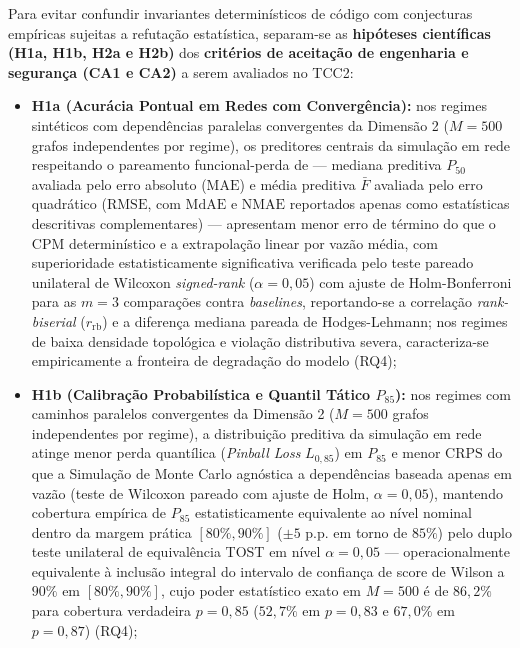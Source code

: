 \documentclass[12pt,openany,oneside,a4paper,english,brazilian,sumario=tradicional]{abntex2}
\begin{document}
Para evitar confundir invariantes determinísticos de código com conjecturas empíricas sujeitas a refutação estatística, separam-se as \textbf{hipóteses científicas (H1a, H1b, H2a e H2b)} dos \textbf{critérios de aceitação de engenharia e segurança (CA1 e CA2)} a serem avaliados no TCC2:

\begin{itemize}
  \item \textbf{H1a (Acurácia Pontual em Redes com Convergência):} nos regimes sintéticos com dependências paralelas convergentes da Dimensão 2 ($M=500$ grafos independentes por regime), os preditores centrais da simulação em rede respeitando o pareamento funcional-perda de  — mediana preditiva $P_{50}$ avaliada pelo erro absoluto ($\mathrm{MAE}$) e média preditiva $\bar{F}$ avaliada pelo erro quadrático ($\mathrm{RMSE}$, com $\mathrm{MdAE}$ e $\mathrm{NMAE}$ reportados apenas como estatísticas descritivas complementares) — apresentam menor erro de término do que o CPM determinístico e a extrapolação linear por vazão média, com superioridade estatisticamente significativa verificada pelo teste pareado unilateral de Wilcoxon \textit{signed-rank} ($\alpha=0{,}05$) com ajuste de Holm-Bonferroni para as $m=3$ comparações contra \textit{baselines}, reportando-se a correlação \textit{rank-biserial} ($r_{\mathrm{rb}}$) e a diferença mediana pareada de Hodges-Lehmann; nos regimes de baixa densidade topológica e violação distributiva severa, caracteriza-se empiricamente a fronteira de degradação do modelo (RQ4);
  \item \textbf{H1b (Calibração Probabilística e Quantil Tático $P_{85}$):} nos regimes com caminhos paralelos convergentes da Dimensão 2 ($M=500$ grafos independentes por regime), a distribuição preditiva da simulação em rede atinge menor perda quantílica (\textit{Pinball Loss} $L_{0{,}85}$) em $P_{85}$ e menor $\mathrm{CRPS}$ do que a Simulação de Monte Carlo agnóstica a dependências baseada apenas em vazão \cite{vacanti2015} (teste de Wilcoxon pareado com ajuste de Holm, $\alpha=0{,}05$), mantendo cobertura empírica de $P_{85}$ estatisticamente equivalente ao nível nominal dentro da margem prática $[80\%, 90\%]$ ($\pm 5$ p.p. em torno de $85\%$) pelo duplo teste unilateral de equivalência TOST \cite{schuirmann1987} em nível $\alpha=0{,}05$ — operacionalmente equivalente à inclusão integral do intervalo de confiança de score de Wilson a $90\%$ em $[80\%, 90\%]$, cujo poder estatístico exato em $M=500$ é de $86{,}2\%$ para cobertura verdadeira $p=0{,}85$ ($52{,}7\%$ em $p=0{,}83$ e $67{,}0\%$ em $p=0{,}87$) (RQ4);

\end{itemize}
\end{document}
